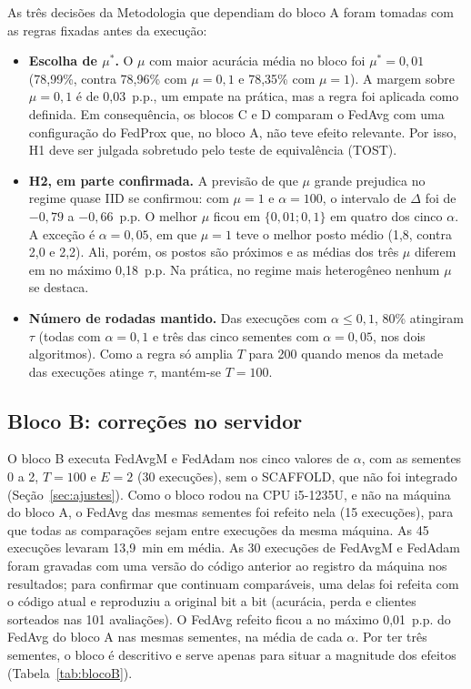 As três decisões da Metodologia que dependiam do bloco A foram tomadas com as regras fixadas antes da execução:
\begin{itemize}
    \item \textbf{Escolha de $\mu^*$.} O $\mu$ com maior acurácia média no bloco foi $\mu^* = 0{,}01$ (78,99\%, contra 78,96\% com $\mu = 0{,}1$ e 78,35\% com $\mu = 1$). A margem sobre $\mu = 0{,}1$ é de 0,03~p.p., um empate na prática, mas a regra foi aplicada como definida. Em consequência, os blocos C e D comparam o FedAvg com uma configuração do FedProx que, no bloco A, não teve efeito relevante. Por isso, H1 deve ser julgada sobretudo pelo teste de equivalência (TOST).
    \item \textbf{H2, em parte confirmada.} A previsão de que $\mu$ grande prejudica no regime quase IID se confirmou: com $\mu = 1$ e $\alpha = 100$, o intervalo de $\Delta$ foi de $-0{,}79$ a $-0{,}66$~p.p. O melhor $\mu$ ficou em $\{0{,}01; 0{,}1\}$ em quatro dos cinco $\alpha$. A exceção é $\alpha = 0{,}05$, em que $\mu = 1$ teve o melhor posto médio (1,8, contra 2,0 e 2,2). Ali, porém, os postos são próximos e as médias dos três $\mu$ diferem em no máximo 0,18~p.p. Na prática, no regime mais heterogêneo nenhum $\mu$ se destaca.
    \item \textbf{Número de rodadas mantido.} Das execuções com $\alpha \leq 0{,}1$, 80\% atingiram $\tau$ (todas com $\alpha = 0{,}1$ e três das cinco sementes com $\alpha = 0{,}05$, nos dois algoritmos). Como a regra só amplia $T$ para 200 quando menos da metade das execuções atinge $\tau$, mantém-se $T = 100$.
\end{itemize}

\subsection{Bloco B: correções no servidor}
\label{sec:blocoB}

O bloco B executa FedAvgM e FedAdam nos cinco valores de $\alpha$, com as sementes 0 a 2, $T = 100$ e $E = 2$ (30 execuções), sem o SCAFFOLD, que não foi integrado (Seção~\ref{sec:ajustes}). Como o bloco rodou na CPU i5-1235U, e não na máquina do bloco A, o FedAvg das mesmas sementes foi refeito nela (15 execuções), para que todas as comparações sejam entre execuções da mesma máquina. As 45 execuções levaram 13,9~min em média. As 30 execuções de FedAvgM e FedAdam foram gravadas com uma versão do código anterior ao registro da máquina nos resultados; para confirmar que continuam comparáveis, uma delas foi refeita com o código atual e reproduziu a original bit a bit (acurácia, perda e clientes sorteados nas 101 avaliações). O FedAvg refeito ficou a no máximo 0,01~p.p. do FedAvg do bloco A nas mesmas sementes, na média de cada $\alpha$. Por ter três sementes, o bloco é descritivo e serve apenas para situar a magnitude dos efeitos (Tabela~\ref{tab:blocoB}).

